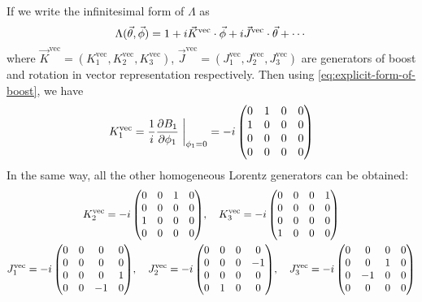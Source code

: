 If we write the infinitesimal form of $\Lambda$ as
\begin{equation} \label{eq:infinitesimal-form-of-Lambda}
  \Lambda(\vec{\theta},\vec{\phi}) = 1+i\vec{K}^\text{vec}\cdot\vec{\phi}+i\vec{J}^\text{vec}\cdot\vec{\theta}+\cdots
\end{equation}
where $\vec{K}^\text{vec}=(K_1^\text{vec},K_2^\text{vec},K_3^\text{vec})$, $\vec{J}^\text{vec} = (J_1^\text{vec},J_2^\text{vec},J_3^\text{vec})$ are generators of boost and rotation in vector representation respectively. Then using \eqref{eq:explicit-form-of-boost}, we have
\begin{equation} \label{eq:K1-vector-representation}
  K_1^\text{vec} = \frac{1}{i}\pdv{B_1}{\f_1}\eval{}_{\f_1=0}
        = -i \, \mqty(0 & 1 & 0 & 0 \\
                      1 & 0 & 0 & 0 \\
                      0 & 0 & 0 & 0 \\
                      0 & 0 & 0 & 0)
\end{equation}
In the same way, all the other homogeneous Lorentz generators can be obtained:
\begin{gather} 
  K_2^\text{vec} = -i \, \mqty(0 & 0 & 1 & 0   \\
                      0 & 0 & 0 & 0   \\
                      1 & 0 & 0 & 0   \\
                      0 & 0 & 0 & 0)  \qc
  K_3^\text{vec} = -i \, \mqty(0 & 0 & 0 & 1   \\
                      0 & 0 & 0 & 0   \\
                      0 & 0 & 0 & 0   \\
                      1 & 0 & 0 & 0)  \label{eq:K2-K3-vector-representation} \\
  J_1^\text{vec} = -i \, \mqty(0 & 0 &  0 & 0  \\
                      0 & 0 &  0 & 0  \\
                      0 & 0 &  0 & 1  \\
                      0 & 0 & -1 & 0) \qc
  J_2^\text{vec} = -i \, \mqty(0 & 0 & 0 &  0  \\
                      0 & 0 & 0 & -1  \\
                      0 & 0 & 0 &  0  \\
                      0 & 1 & 0 &  0) \qc
  J_3^\text{vec} = -i \, \mqty(0 &  0 & 0 & 0  \\
                      0 &  0 & 1 & 0  \\
                      0 & -1 & 0 & 0  \\
                      0 &  0 & 0 & 0) \label{eq:J-vector-representation}
\end{gather}
